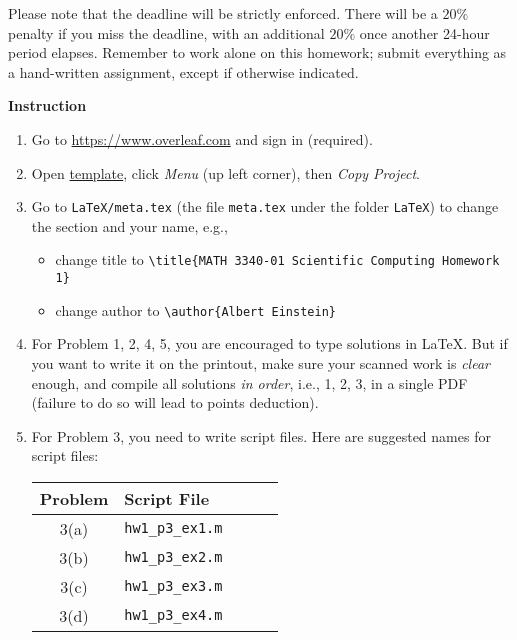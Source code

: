 Please note that the deadline will be strictly enforced. There will be a $20\%$ penalty if you miss the deadline, with an additional $20\%$ once another 24-hour period elapses. Remember to work alone on this homework; submit everything as a hand-written assignment, except if otherwise indicated.

\vspace{15pt}

\textbf{Instruction}

\begin{enumerate}[label={\arabic*.}]
  \item Go to \url{https://www.overleaf.com} and sign in (required).
  \item Open \href{https://www.overleaf.com/read/qhfsxjjmrpcs}{template}, click \emph{Menu} (up left corner), then \emph{Copy Project}.
  \item Go to \verb|LaTeX/meta.tex| (the file \verb|meta.tex| under the folder \verb|LaTeX|) to change the section and your name, e.g.,
    \begin{itemize}
      \item change title to \verb|\title{MATH 3340-01 Scientific Computing Homework 1}|
      \item change author to \verb|\author{Albert Einstein}|
    \end{itemize}
  \item For Problem 1, 2, 4, 5, you are encouraged to type solutions in \LaTeX{}. But if you want to write it on the printout, make sure your scanned work is \emph{clear} enough, and compile all solutions \emph{in order}, i.e., 1, 2, 3, in a single PDF (failure to do so will lead to points deduction).
  \item For Problem 3, you need to write script files. Here are suggested names for script files:
    \begin{table}[!hbtp]
      \centering
      \begin{tabular}{cllll}
        \toprule
        Problem & Script File         \\
        \midrule
        3(a)    & \verb|hw1_p3_ex1.m| \\
        3(b)    & \verb|hw1_p3_ex2.m| \\
        3(c)    & \verb|hw1_p3_ex3.m| \\
        3(d)    & \verb|hw1_p3_ex4.m| \\
        \bottomrule
      \end{tabular}
    \end{table}


\end{enumerate}
